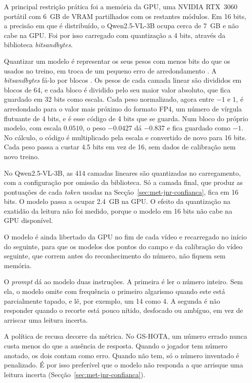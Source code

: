 A principal restrição prática foi a memória da GPU, uma NVIDIA RTX~3060 portátil com 6~GB de VRAM partilhados com os restantes módulos. Em 16 bits, a precisão em que é distribuído, o Qwen2.5-VL-3B ocupa cerca de 7~GB e não cabe na GPU. Foi por isso carregado com quantização a 4 bits, através da biblioteca \emph{bitsandbytes}.

Quantizar um modelo é representar os seus pesos com menos bits do que os usados no treino, em troca de um pequeno erro de arredondamento \citep{gholami2021survey}. A \emph{bitsandbytes} fá-lo por blocos \citep{dettmers2023case, dettmers2023qlora}. Os pesos de cada camada linear são divididos em blocos de 64, e cada bloco é dividido pelo seu maior valor absoluto, que fica guardado em 32 bits como escala. Cada peso normalizado, agora entre $-1$ e $1$, é arredondado para o valor mais próximo do formato FP4, um número de vírgula flutuante de 4 bits, e é esse código de 4 bits que se guarda. Num bloco do próprio modelo, com escala $0.0510$, o peso $-0.0427$ dá $-0.837$ e fica guardado como $-1$. No cálculo, o código é multiplicado pela escala e convertido de novo para 16 bits. Cada peso passa a custar 4.5 bits em vez de 16, sem dados de calibração nem novo treino.

No Qwen2.5-VL-3B, as 414 camadas lineares são quantizadas no carregamento, com a configuração por omissão da biblioteca. Só a camada final, que produz as pontuações de cada \emph{token} usadas na Secção~\ref{sec:met-jnr-confianca}, fica em 16 bits. O modelo passa a ocupar 2.4~GB na GPU. O efeito da quantização na exatidão da leitura não foi medido, porque o modelo em 16 bits não cabe na GPU disponível.

O modelo é ainda libertado da GPU no fim de cada vídeo e recarregado no início do seguinte, para que os modelos dos pontos do campo e da calibração do vídeo seguinte, que correm antes do reconhecimento do número, não fiquem sem memória.

O \emph{prompt} dá ao modelo duas instruções. A primeira é ler o número inteiro. Sem ela, o modelo omite com frequência o primeiro algarismo quando este está parcialmente tapado, e lê, por exemplo, um 14 como 4. A segunda é não responder quando o recorte está pouco nítido, desfocado ou ambíguo, em vez de arriscar uma leitura incerta.

A política de recusa decorre da métrica. No GS-HOTA, um número errado nunca custa menos do que a ausência de resposta. Quando o jogador tem número anotado, os dois contam como erro. Quando não tem, só o número inventado é penalizado. É por isso preferível que o modelo não responda a que arrisque uma leitura incerta (Secção~\ref{sec:met-jnr-confianca}).

